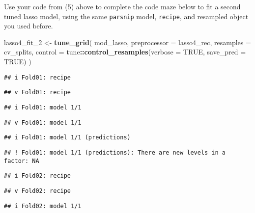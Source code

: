 \documentclass[
]{article}
\newenvironment{Shaded}{\begin{snugshade}}{\end{snugshade}}
\newcommand{\DataTypeTok}[1]{\textcolor[rgb]{0.13,0.29,0.53}{#1}}
\newcommand{\DecValTok}[1]{\textcolor[rgb]{0.00,0.00,0.81}{#1}}
\newcommand{\KeywordTok}[1]{\textcolor[rgb]{0.13,0.29,0.53}{\textbf{#1}}}
\newcommand{\NormalTok}[1]{#1}
\newcommand{\OperatorTok}[1]{\textcolor[rgb]{0.81,0.36,0.00}{\textbf{#1}}}
\newcommand{\OtherTok}[1]{\textcolor[rgb]{0.56,0.35,0.01}{#1}}
\newcommand{\StringTok}[1]{\textcolor[rgb]{0.31,0.60,0.02}{#1}}
\begin{document}
Use your code from (5) above to complete the code maze below to fit a
second tuned lasso model, using the same \texttt{parsnip} model,
\texttt{recipe}, and resampled object you used before.

\begin{Shaded}
\begin{Highlighting}[]
\NormalTok{lasso4_fit_}\DecValTok{2}\NormalTok{ <-}\StringTok{ }\KeywordTok{tune_grid}\NormalTok{(}
\NormalTok{  mod_lasso,}
  \DataTypeTok{preprocessor =}\NormalTok{ lasso4_rec,}
  \DataTypeTok{resamples =}\NormalTok{ cv_splits,}
  \DataTypeTok{control =}\NormalTok{ tune}\OperatorTok{::}\KeywordTok{control_resamples}\NormalTok{(}\DataTypeTok{verbose =} \OtherTok{TRUE}\NormalTok{,}
                                    \DataTypeTok{save_pred =} \OtherTok{TRUE}\NormalTok{)}
\NormalTok{)}
\end{Highlighting}
\end{Shaded}

\begin{verbatim}
## i Fold01: recipe
\end{verbatim}

\begin{verbatim}
## v Fold01: recipe
\end{verbatim}

\begin{verbatim}
## i Fold01: model 1/1
\end{verbatim}

\begin{verbatim}
## v Fold01: model 1/1
\end{verbatim}

\begin{verbatim}
## i Fold01: model 1/1 (predictions)
\end{verbatim}

\begin{verbatim}
## ! Fold01: model 1/1 (predictions): There are new levels in a factor: NA
\end{verbatim}

\begin{verbatim}
## i Fold02: recipe
\end{verbatim}

\begin{verbatim}
## v Fold02: recipe
\end{verbatim}

\begin{verbatim}
## i Fold02: model 1/1
\end{verbatim}
\end{document}
